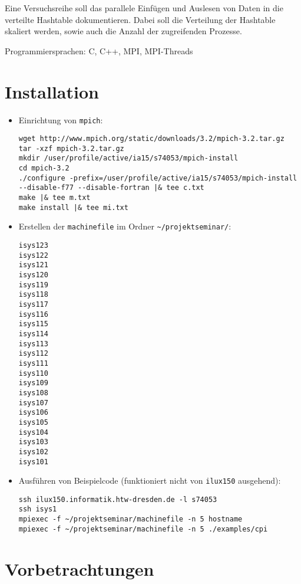 \documentclass{scrreprt}
\begin{document}
Eine Versuchsreihe soll das parallele Einfügen und Auslesen von Daten in die verteilte Hashtable dokumentieren. Dabei soll die Verteilung der Hashtable skaliert werden, sowie auch die Anzahl der zugreifenden Prozesse.

Programmiersprachen: C, C++, MPI, MPI-Threads


\chapter{Installation}

\begin{itemize}
\item Einrichtung von \verb|mpich|:
\begin{lstlisting}
wget http://www.mpich.org/static/downloads/3.2/mpich-3.2.tar.gz
tar -xzf mpich-3.2.tar.gz
mkdir /user/profile/active/ia15/s74053/mpich-install
cd mpich-3.2
./configure -prefix=/user/profile/active/ia15/s74053/mpich-install --disable-f77 --disable-fortran |& tee c.txt
make |& tee m.txt
make install |& tee mi.txt
\end{lstlisting}

\item Erstellen der \verb|machinefile| im Ordner \verb|~/projektseminar/|:
\begin{lstlisting}
isys123
isys122
isys121
isys120
isys119
isys118
isys117
isys116
isys115
isys114
isys113
isys112
isys111
isys110
isys109
isys108
isys107
isys106
isys105
isys104
isys103
isys102
isys101
\end{lstlisting}
\item Ausführen von Beispielcode (funktioniert nicht von \verb|ilux150| ausgehend):
\begin{lstlisting}
ssh ilux150.informatik.htw-dresden.de -l s74053
ssh isys1
mpiexec -f ~/projektseminar/machinefile -n 5 hostname
mpiexec -f ~/projektseminar/machinefile -n 5 ./examples/cpi
\end{lstlisting}
\end{itemize}

\chapter{Vorbetrachtungen}
\end{document}
